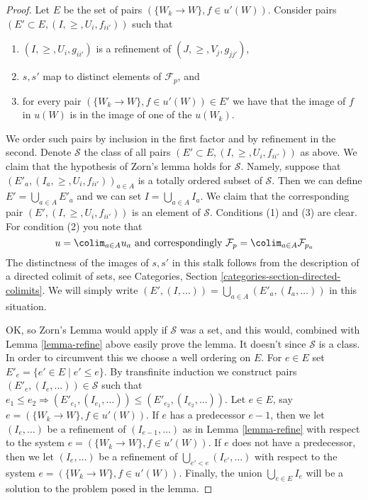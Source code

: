 \begin{proof}
Let $E$ be the set of pairs $(\{W_k \to W\}, f\in u'(W))$.
Consider pairs $(E' \subset E, (I, \geq, U_i, f_{ii'}))$
such that
\begin{enumerate}
\item $(I, \geq, U_i, g_{ii'})$ is a refinement of $(J, \geq, V_j, g_{jj'})$,
\item $s, s'$ map to distinct elements of $\mathcal{F}_p$, and
\item for every pair $(\{W_k \to W\}, f\in u'(W)) \in E'$ we have that
the image of $f$ in $u(W)$ is in the image of one of the $u(W_k)$.
\end{enumerate}
We order such pairs by inclusion in the first factor and
by refinement in the second. Denote $\mathcal{S}$ the class
of all pairs $(E' \subset E, (I, \geq, U_i, f_{ii'}))$ as above.
We claim that the hypothesis of Zorn's lemma holds for $\mathcal{S}$. Namely,
suppose that $(E'_a, (I_a, \geq, U_i, f_{ii'}))_{a \in A}$
is a totally ordered subset of $\mathcal{S}$. Then we can define
$E' = \bigcup_{a \in A} E'_a$ and we can set $I = \bigcup_{a \in A} I_a$.
We claim that the corresponding pair
$(E' , (I, \geq, U_i, f_{ii'}))$ is an element of $\mathcal{S}$.
Conditions (1) and (3) are clear. For condition (2) you note
that
$$
u = \colim_{a \in A} u_a
\text{ and correspondingly }
\mathcal{F}_p = \colim_{a \in A} \mathcal{F}_{p_a}
$$
The distinctness of the images of $s, s'$ in this stalk follows
from the description of a directed colimit of sets, see
Categories, Section \ref{categories-section-directed-colimits}.
We will simply write
$(E', (I, \ldots)) = \bigcup_{a \in A}(E'_a, (I_a, \ldots))$
in this situation.

\medskip\noindent
OK, so Zorn's Lemma would apply if $\mathcal{S}$ was a set,
and this would, combined with Lemma \ref{lemma-refine} above easily prove
the lemma. It doesn't since $\mathcal{S}$ is a class. In order
to circumvent this we choose a well ordering on $E$.
For $e \in E$ set $E'_e = \{e' \in E \mid e' \leq e\}$.
By transfinite induction we construct pairs
$(E'_e, (I_e, \ldots)) \in \mathcal{S}$ such that
$e_1 \leq e_2 \Rightarrow (E'_{e_1}, (I_{e_1}, \ldots))
\leq (E'_{e_2}, (I_{e_2}, \ldots))$.
Let $e \in E$, say $e = (\{W_k \to W\}, f\in u'(W))$.
If $e$ has a predecessor $e - 1$, then we let
$(I_e, \ldots)$ be a refinement of $(I_{e - 1}, \ldots)$
as in Lemma \ref{lemma-refine} with respect to the system
$e = (\{W_k \to W\}, f\in u'(W))$.
If $e$ does not have a predecessor, then we let
$(I_e, \ldots)$ be a refinement of $\bigcup_{e' < e} (I_{e'}, \ldots)$
with respect to the system
$e = (\{W_k \to W\}, f\in u'(W))$.
Finally, the union $\bigcup_{e \in E} I_e$ will be a solution to
the problem posed in the lemma.
\end{proof}

